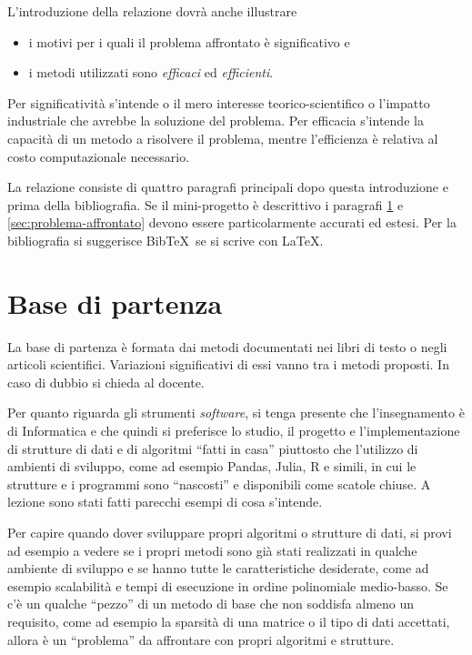 \documentclass[runningheads]{llncs}
\begin{document}
L'introduzione della relazione dovr\`a anche illustrare
\begin{itemize}
\item i motivi per i quali il problema affrontato \`e significativo e
\item i metodi utilizzati sono \emph{efficaci} ed \emph{efficienti}.
\end{itemize}
Per significativit\`a s'intende o il mero interesse
teorico-scientifico o l'impatto industriale che avrebbe la soluzione
del problema.  Per efficacia s'intende la capacit\`a di un metodo a
risolvere il problema, mentre l'efficienza \`e relativa al costo
computazionale necessario.

La relazione consiste di quattro paragrafi principali dopo questa
introduzione e prima della bibliografia.  Se il mini-progetto \`e
descrittivo i paragrafi \ref{sec:base-di-partenza} e
\ref{sec:problema-affrontato} devono essere particolarmente accurati
ed estesi.  Per la bibliografia si suggerisce Bib\TeX\ se si scrive con \LaTeX.

\section{Base di partenza}
\label{sec:base-di-partenza}

La base di partenza \`e formata dai metodi documentati nei libri di
testo o negli articoli scientifici.  Variazioni significativi di essi
vanno tra i metodi proposti.  In caso di dubbio si chieda al docente.

Per quanto riguarda gli strumenti \textit{software}, si tenga presente
che l'insegnamento \`e di Informatica e che quindi si preferisce lo
studio, il progetto e l'implementazione di strutture di dati e di
algoritmi ``fatti in casa'' piuttosto che l'utilizzo di ambienti di
sviluppo, come ad esempio Pandas, Julia, R e simili, in cui le
strutture e i programmi sono ``nascosti'' e disponibili come scatole
chiuse.  A lezione sono stati fatti parecchi esempi di cosa s'intende.

Per capire quando dover sviluppare propri algoritmi o strutture di
dati, si provi ad esempio a vedere se i propri metodi sono gi\`a stati
realizzati in qualche ambiente di sviluppo e se hanno tutte le
caratteristiche desiderate, come ad esempio scalabilit\`a e tempi di
esecuzione in ordine polinomiale medio-basso.  Se c'\`e un qualche
``pezzo'' di un metodo di base che non soddisfa almeno un requisito,
come ad esempio la sparsit\`a di una matrice o il tipo di dati
accettati, allora \`e un ``problema'' da affrontare con propri
algoritmi e strutture.
\end{document}
